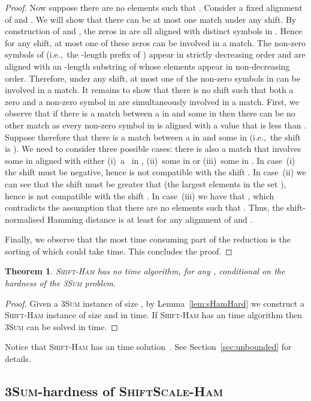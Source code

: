 \documentclass[11pt]{article}
\newcommand{\sHam}{\textsc{Shift-Ham}\xspace}
\newcommand{\ssHam}{\textsc{ShiftScale-Ham}\xspace}
\newcommand{\threeSUM}{\textsc{3Sum}\xspace}
\theoremstyle{plain}
\newtheorem{theorem}{Theorem}[]
\theoremstyle{definition}
\begin{document}
\begin{proof}
    Now suppose there are no elements  such that . Consider a fixed alignment of  and . We will show that there can be at most one match under any shift. By construction of  and , the zeros in  are all aligned with distinct symbols in . Hence for any shift, at most one of these zeros can be involved in a match. The non-zero symbols of  (i.e.,~the -length prefix of ) appear in strictly decreasing order and are aligned with an -length substring of  whose elements appear in non-decreasing order. Therefore, under any shift, at most one of the non-zero symbols in  can be involved in a match. It remains to show that there is no shift such that both a zero and a non-zero symbol in  are simultaneously involved in a match. First, we observe that if there is a match between a  in  and some  in  then there can be no other match as every non-zero symbol in  is aligned with a value that is less than . Suppose therefore that there is a match between a  in  and some  in  (i.e.,~the shift is ). We need to consider three possible cases: there is also a match that involves some  in  aligned with either (i)~a~ in , (ii)~some  in  or (iii)~some  in . In case~(i) the shift must be negative, hence is not compatible with the shift . In case~(ii) we can see that the shift must be greater that  (the largest elements in the set ), hence is not compatible with the shift . In case~(iii) we have that , which contradicts the assumption that there are no elements  such that . Thus, the shift-normalised Hamming distance is at least  for any alignment of  and .

    Finally, we observe that the most time consuming part of the reduction is the sorting of  which could take  time. This concludes the proof.
\end{proof}

\begin{theorem}
    \label{thm:sHamLower}
    \sHam has no  time algorithm, for any , conditional on the hardness of the \threeSUM problem.
\end{theorem}
\begin{proof}
    Given a \threeSUM instance of size , by Lemma~\ref{lem:sHamHard} we construct a \sHam instance of size  and  in  time. If \sHam has an  time algorithm then \threeSUM can be solved in  time.
\end{proof}


Notice that \sHam has an  time solution~\cite{MNU:2005}. See Section~\ref{sec:unbounded} for details.


\subsection{\threeSUM-hardness of \ssHam}
\end{document}
